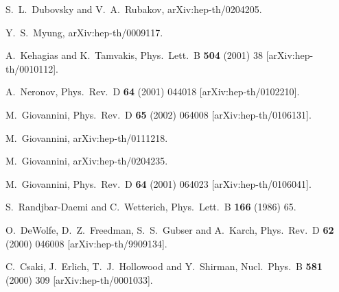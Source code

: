 \documentclass[a4paper,12pt]{article}
\begin{document}
\begin{thebibliography}{99}
S.~L.~Dubovsky and V.~A.~Rubakov,
arXiv:hep-th/0204205.

Y.~S.~Myung,
arXiv:hep-th/0009117.

A.~Kehagias and K.~Tamvakis,
Phys.\ Lett.\ B {\bf 504} (2001) 38
[arXiv:hep-th/0010112].

A.~Neronov,
Phys.\ Rev.\ D {\bf 64} (2001) 044018
[arXiv:hep-th/0102210].

M.~Giovannini,
Phys.\ Rev.\ D {\bf 65} (2002) 064008
[arXiv:hep-th/0106131].

M.~Giovannini,
arXiv:hep-th/0111218.

M.~Giovannini,
arXiv:hep-th/0204235.


M.~Giovannini,
Phys.\ Rev.\ D {\bf 64} (2001) 064023
[arXiv:hep-th/0106041].

S.~Randjbar-Daemi and C.~Wetterich,
Phys.\ Lett.\ B {\bf 166} (1986) 65.

O.~DeWolfe, D.~Z.~Freedman, S.~S.~Gubser and A.~Karch,
Phys.\ Rev.\ D {\bf 62} (2000) 046008
[arXiv:hep-th/9909134].

C.~Csaki, J.~Erlich, T.~J.~Hollowood and Y.~Shirman,
Nucl.\ Phys.\ B {\bf 581} (2000) 309
[arXiv:hep-th/0001033].


\end{thebibliography}
\end{document}
